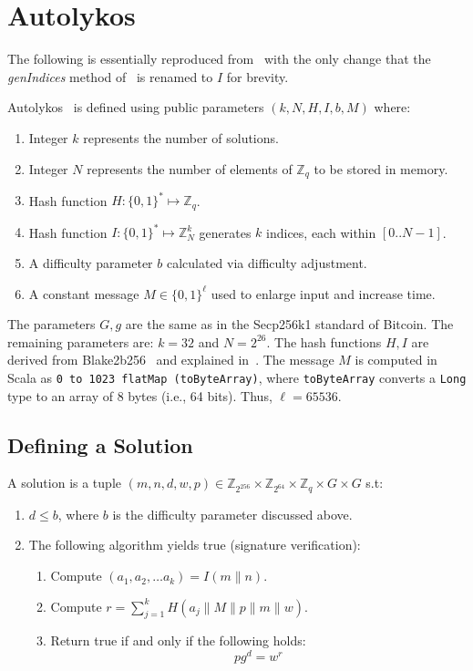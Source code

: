 \documentclass[runningheads]{llncs}
\newcommand{\powname}{Autolykos\xspace}
\begin{document}
\section{\powname}
\label{pow}

The following is essentially reproduced from~\cite{autolykos} with the only change that the {\em genIndices} method of~\cite{autolykos} is renamed to $I$ for brevity.

\powname~\cite{autolykos} is defined using public parameters $(k, N, H, I, b, M)$ where:

\begin{enumerate}
	\item Integer $k$ represents the number of solutions.
	\item Integer $N$ represents the number of elements of $\mathbb{Z}_q$ to be stored in memory.
	\item Hash function $H:\{0,1\}^* \mapsto \mathbb{Z}_q$. 
	\item Hash function $I:\{0,1\}^* \mapsto {\mathbb{Z}^k_N}$ generates $k$ indices, each within $[0..N-1]$.
	\item A difficulty parameter $b$ calculated via difficulty adjustment.
	\item A constant message $M\in\{0, 1\}^\ell$ used to enlarge input and increase time.
\end{enumerate}

The parameters $G, g$ are the same as in the Secp256k1 standard of Bitcoin. The remaining parameters are: 
$k = 32$ and $N = 2^{26}$. The hash functions $H, I$ are derived from Blake2b256~\cite{rfc7693} and explained in~\cite{autolykos}. The message $M$ is computed in Scala as \texttt{0 to 1023 flatMap (toByteArray)}, where \texttt{toByteArray} converts a \texttt{Long} type to an array of 8 bytes (i.e., 64 bits). Thus, $\ell = 65536$.

\subsection{Defining a Solution}

A solution is a tuple $(m, n, d, w, p) \in \mathbb{Z}_{2^{256}} \times \mathbb{Z}_{2^{64}}\times \mathbb{Z}_{q}\times G \times G$ s.t: 
\begin{enumerate}
	\item $d \leq b$, where $b$ is the difficulty parameter discussed above.
	\item The following algorithm yields true (signature verification):
	\begin{enumerate}
		\item Compute $(a_1, a_2, \ldots a_k) = I(m\|n)$.
		\item Compute $r = \sum^{k}_{j=1}H(a_j\|M\|{p}\|m\|w)$.
		\item Return true if and only if the following holds: 
		\begin{equation}
		\label{verif}
		{p}g^d = w^r
		\end{equation} 		
	\end{enumerate}
\end{enumerate}
\end{document}
